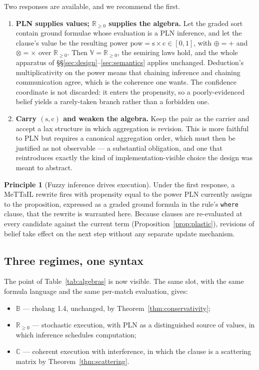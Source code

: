 \documentclass[11pt,a4paper]{article}
\theoremstyle{plain}
\theoremstyle{definition}
\newtheorem{principle}[theorem]{Principle}
\theoremstyle{remark}
\newcommand{\V}{\mathbb{V}}
\newcommand{\Bool}{\mathbb{B}}
\newcommand{\Rnn}{\mathbb{R}_{\geq 0}}
\newcommand{\Cx}{\mathbb{C}}
\newcommand{\tensorv}{\otimes}
\newcommand{\sumv}{\oplus}
\newcommand{\pow}{\mathrm{pow}}
\newcommand{\str}{\mathrm{s}}
\newcommand{\conf}{\mathrm{c}}
\begin{document}
Two responses are available, and we recommend the first.

\begin{enumerate}[leftmargin=1.4em,itemsep=3pt]
\item \textbf{PLN supplies values; $\Rnn$ supplies the algebra.} Let the graded
sort contain ground formulae whose evaluation is a PLN inference, and let the
clause's value be the resulting power $\pow = \str\times\conf \in [0,1]$, with
$\sumv = +$ and $\tensorv = \times$ over $\Rnn$. Then $\V = \Rnn$, the semiring
laws hold, and the whole apparatus of \S\S\ref{sec:design}--\ref{sec:semantics}
applies unchanged. Deduction's multiplicativity on the power means that chaining
inference and chaining communication agree, which is the coherence one wants.
The confidence coordinate is not discarded: it enters the propensity, so a
poorly-evidenced belief yields a rarely-taken branch rather than a forbidden one.
\item \textbf{Carry $(\str,\conf)$ and weaken the algebra.} Keep the pair as the
carrier and accept a lax structure in which aggregation is revision. This is more
faithful to PLN but requires a canonical aggregation order, which must then be
justified as not observable --- a substantial obligation, and one that
reintroduces exactly the kind of implementation-visible choice the design was
meant to abstract.
\end{enumerate}

\begin{principle}[Fuzzy inference drives execution]\label{prin:pln}
Under the first response, a MeTTaIL rewrite fires with propensity equal to the
power PLN currently assigns to the proposition, expressed as a graded ground
formula in the rule's \texttt{where} clause, that the rewrite is warranted here.
Because clauses are re-evaluated at every candidate against the current term
(Proposition~\ref{prop:plastic}), revisions of belief take effect on the next
step without any separate update mechanism.
\end{principle}

\subsection{Three regimes, one syntax}

The point of Table~\ref{tab:algebras} is now visible. The same slot, with the
same formula language and the same per-match evaluation, gives:

\begin{itemize}[leftmargin=1.4em,itemsep=2pt]
\item $\Bool$ --- rholang 1.4, unchanged, by Theorem~\ref{thm:conservativity};
\item $\Rnn$ --- stochastic execution, with PLN as a distinguished source of
values, in which inference schedules computation;
\item $\Cx$ --- coherent execution with interference, in which the clause is a
scattering matrix by Theorem~\ref{thm:scattering}.
\end{itemize}
\end{document}
